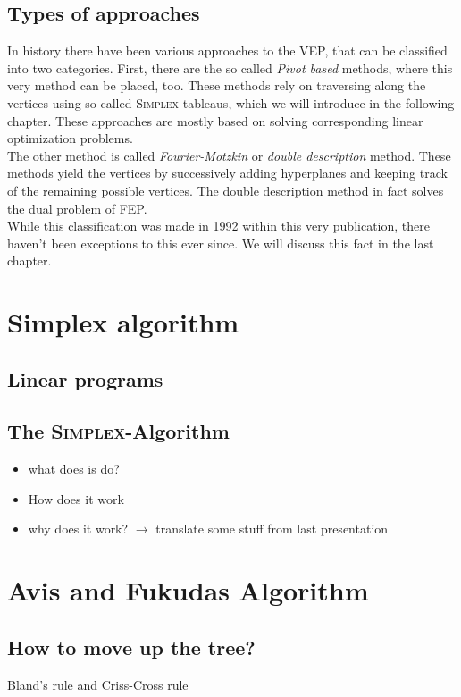 \documentclass[a4paper, 11pt]{article}
\begin{document}
\subsection{Types of approaches}
In history there have been various approaches to the VEP, that can be classified into two categories. First, there are the so called \textit{Pivot based} methods, where this very method can be placed, too. These methods rely on traversing along the vertices using so called \textsc{Simplex} tableaus, which we will introduce in the following chapter. These approaches are mostly based on solving corresponding linear optimization problems.\\

The other method is called \textit{Fourier-Motzkin} or \textit{double description} method\cite{Motzkin}. These methods yield the vertices by successively adding hyperplanes and keeping track of the remaining possible vertices. The double description method in fact solves the dual problem of FEP. \\

While this classification was made in 1992 within this very publication, there haven't been exceptions to this ever since. We will discuss this fact in the last chapter.

\section{Simplex algorithm}
\subsection{Linear programs}
\subsection{The \textsc{Simplex}-Algorithm}
\begin{itemize}
	\item what does is do?
	\item How does it work
	\item why does it work? $\rightarrow$ translate some stuff from last presentation
\end{itemize}

\section{Avis and Fukudas Algorithm}
\subsection{How to move up the tree?}
Bland's rule and Criss-Cross rule
\end{document}
